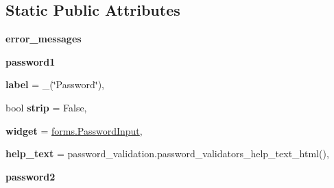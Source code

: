 \subsection*{Static Public Attributes}
\begin{DoxyCompactItemize}
\item 
\mbox{\label{classdjango_1_1contrib_1_1auth_1_1forms_1_1_user_creation_form_a132cc99069a245fff65476b732ca686f}} 
{\bfseries error\+\_\+messages}
\item 
\mbox{\label{classdjango_1_1contrib_1_1auth_1_1forms_1_1_user_creation_form_acaff7e2dc1f9426c67a8991aa6b520f0}} 
{\bfseries password1}
\item 
\mbox{\label{classdjango_1_1contrib_1_1auth_1_1forms_1_1_user_creation_form_a8b331b3418a0bb7ed3478c630c0f6514}} 
{\bfseries label} = \+\_\+(\char`\"{}Password\char`\"{}),
\item 
\mbox{\label{classdjango_1_1contrib_1_1auth_1_1forms_1_1_user_creation_form_a3423c5f98492787f5edcdb2124b15276}} 
bool {\bfseries strip} = False,
\item 
\mbox{\label{classdjango_1_1contrib_1_1auth_1_1forms_1_1_user_creation_form_aabdb6b1b1f728bd0cba5c39ff4bf41df}} 
{\bfseries widget} = \mbox{\hyperlink{classdjango_1_1forms_1_1widgets_1_1_password_input}{forms.\+Password\+Input}},
\item 
\mbox{\label{classdjango_1_1contrib_1_1auth_1_1forms_1_1_user_creation_form_a005fd3ad3de0d0f5259a4032679422f6}} 
{\bfseries help\+\_\+text} = password\+\_\+validation.\+password\+\_\+validators\+\_\+help\+\_\+text\+\_\+html(),
\item 
\mbox{\label{classdjango_1_1contrib_1_1auth_1_1forms_1_1_user_creation_form_a83d6eb1016787d8c5693cd32b3f204a4}} 
{\bfseries password2}
\end{DoxyCompactItemize}
